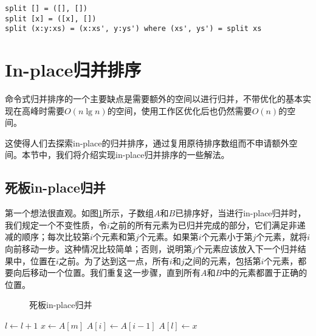 \documentclass[UTF8]{article}
\begin{document}
\lstset{language=Haskell}
\begin{lstlisting}[style=Haskell]
split [] = ([], [])
split [x] = ([x], [])
split (x:y:xs) = (x:xs', y:ys') where (xs', ys') = split xs
\end{lstlisting}

\section{In-place归并排序}

命令式归并排序的一个主要缺点是需要额外的空间以进行归并，不带优化的基本实现在高峰时需要$O(n \lg n)$的空间，使用工作区优化后也仍然需要$O(n)$的空间。

这使得人们去探索in-place的归并排序，通过复用原待排序数组而不申请额外空间。本节中，我们将介绍实现in-place归并排序的一些解法。

\subsection{死板in-place归并}

第一个想法很直观。如图\ref{fig:merge-in-place-naive}所示，子数组$A$和$B$已排序好，当进行in-place归并时，我们规定一个不变性质，令$i$之前的所有元素为已归并完成的部分，它们满足非递减的顺序；每次比较第$i$个元素和第$j$个元素。如果第$i$个元素小于第$j$个元素，就将$i$向前移动一步。这种情况比较简单；否则，说明第$j$个元素应该放入下一个归并结果中，位置在$i$之前。为了达到这一点，所有$i$和$j$之间的元素，包括第$i$个元素，都要向后移动一个位置。我们重复这一步骤，直到所有$A$和$B$中的元素都置于正确的位置。

\begin{figure}[htbp]
 \centering
 \caption{死板in-place归并}
 \label{fig:merge-in-place-naive}
\end{figure}

\begin{algorithmic}[1]
      \State $l \gets l + 1$
    \Else
      \State $x \gets A[m]$
       
        \State $A[i] \gets A[i-1]$
      \EndFor
      \State $A[l] \gets x$
    \EndIf
  \EndWhile
\EndProcedure
\end{algorithmic}
\end{document}

